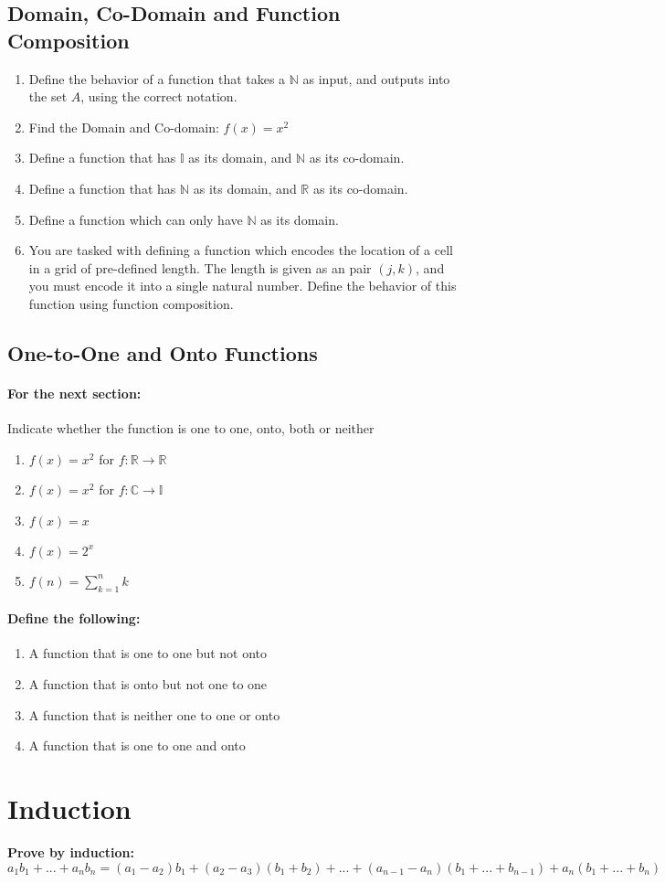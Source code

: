 \documentclass[12pt]{article}
\begin{document}
	\subsection {Domain, Co-Domain and Function Composition}
	\begin{enumerate}
	\item Define the behavior of a function that takes a $\mathbb{N}$ as input, and outputs into the set $A$, using the correct notation.
	\item Find the Domain and Co-domain: $f(x)=x^2$
	\item Define a function that has $\mathbb{I}$ as its domain, and $\mathbb{N}$ as its co-domain.
	\item Define a function that has $\mathbb{N}$ as its domain, and $\mathbb{R}$ as its co-domain.
	\item Define a function which can only have $\mathbb{N}$ as its domain.
	\item You are tasked with defining a function which encodes the location of a cell in a grid of pre-defined length. The length is given as an pair $(j,k)$, and you must encode it into a single natural number. Define the behavior of this function using function composition.
	\end{enumerate}
	\subsection{One-to-One and Onto Functions}
	\paragraph{For the next section:} Indicate whether the function is one to one, onto, both or neither
	\begin{enumerate}
	\item $f(x)=x^2$ for $f:\mathbb{R} \to \mathbb{R}$
	\item $f(x)=x^2$ for $f:\mathbb{C} \to \mathbb{I}$
	\item $f(x)=x$
	\item $f(x)=2^x$
	\item $f(n)= \sum_{k=1}^n k$
	\end{enumerate}
	\paragraph{Define the following: }
	\begin{enumerate}
	\item A function that is one to one but not onto
	\item A function that is onto but not one to one
	\item A function that is neither one to one or onto
	\item A function that is one to one and onto
	\end{enumerate}
\section{Induction}
	\textbf{Prove by induction: } \\ \small $a_1 b_1+...+a_n b_n=(a_1-a_2)b_1+(a_2-a_3)(b_1+b_2)+...+(a_{n-1} - a_n)(b_1+...+b_{n-1})+a_n(b_1+...+b_n)$
\end{document}
